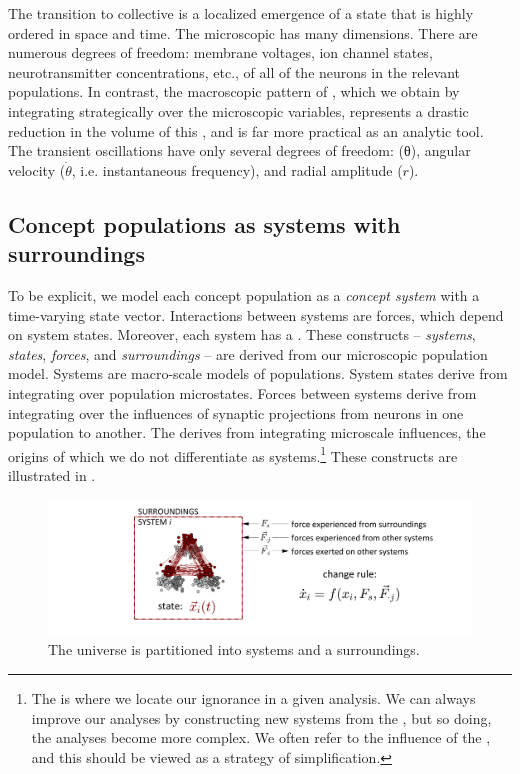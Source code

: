   The transition to collective  is a localized emergence of a state that is highly ordered in space and time. The microscopic  has many dimensions. There are numerous degrees of freedom: membrane voltages, ion channel states, neurotransmitter concentrations, etc., of all of the neurons in the relevant populations. In contrast, the macroscopic pattern of , which we obtain by integrating strategically over the microscopic variables, represents a drastic reduction in the volume of this , and is far more practical as an analytic tool. The transient oscillations have only several degrees of freedom:  (θ), angular velocity ($\dot{\theta}$, i.e. instantaneous frequency), and radial amplitude ($r$).

\subsection{Concept populations as systems with surroundings} 

To be explicit, we model each concept population as a \textit{concept system} with a time-varying state vector. Interactions between systems are forces, which depend on system states. Moreover, each system has a . These constructs -- \textit{systems}, \textit{states}, \textit{forces}, and \textit{surroundings} -- are derived from our microscopic population model. Systems are macro-scale models of populations. System states derive from integrating over population microstates. Forces between systems derive from integrating over the influences of synaptic projections from neurons in one population to another. The  derives from integrating microscale influences, the origins of which we do not differentiate as systems.\footnote{The  is where we locate our ignorance in a given analysis. We can always improve our analyses by constructing new systems from the , but so doing, the analyses become more complex. We often refer to the influence of the , and this should be viewed as a strategy of simplification.} These constructs are illustrated in {}.

  
\begin{figure}
\includegraphics[width=\textwidth]{figures/Tilsen-img11.png}
\caption{The universe is partitioned into systems and a surroundings.}
\label{fig:2:4}
\end{figure}
 

